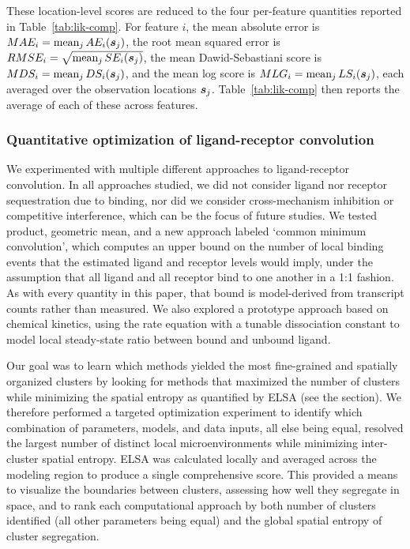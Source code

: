\documentclass[10pt,letterpaper]{article}
\begin{document}
These location-level scores are reduced to the four per-feature quantities reported in Table~\ref{tab:lik-comp}. For feature $i$, the mean absolute error is $MAE_i = \mbox{mean}_j\, AE_i(\mbox{\boldmath $s$}_j)$, the root mean squared error is $RMSE_i = \sqrt{\mbox{mean}_j\, SE_i(\mbox{\boldmath $s$}_j)}$, the mean Dawid-Sebastiani score is $MDS_i = \mbox{mean}_j\, DS_i(\mbox{\boldmath $s$}_j)$, and the mean log score is $MLG_i = \mbox{mean}_j\, LS_i(\mbox{\boldmath $s$}_j)$, each averaged over the observation locations $\mbox{\boldmath $s$}_j$. Table~\ref{tab:lik-comp} then reports the average of each of these across features.

\subsubsection*{Quantitative optimization of ligand-receptor convolution}
\label{sec:meth-conv-comp}

We experimented with multiple different approaches to ligand-receptor convolution. In all approaches studied, we did not consider ligand nor receptor sequestration due to binding, nor did we consider cross-mechanism inhibition or competitive interference, which can be the focus of future studies. We tested product, geometric mean, and a new approach labeled `common minimum convolution', which computes an upper bound on the number of local binding events that the estimated ligand and receptor levels would imply, under the assumption that all ligand and all receptor bind to one another in a 1:1 fashion. As with every quantity in this paper, that bound is model-derived from transcript counts rather than measured. We also explored a prototype approach based on chemical kinetics, using the rate equation with a tunable dissociation constant to model local steady-state ratio between bound and unbound ligand.

Our goal was to learn which methods yielded the most fine-grained and spatially organized clusters by looking for methods that maximized the number of clusters while minimizing the spatial entropy as quantified by ELSA (see the  section). We therefore performed a targeted optimization experiment to identify which combination of parameters, models, and data inputs, all else being equal, resolved the largest number of distinct local microenvironments while minimizing inter-cluster spatial entropy. ELSA was calculated locally and averaged across the modeling region to produce a single comprehensive score. This provided a means to visualize the boundaries between clusters, assessing how well they segregate in space, and to rank each computational approach by both number of clusters identified (all other parameters being equal) and the global spatial entropy of cluster segregation.
\end{document}
